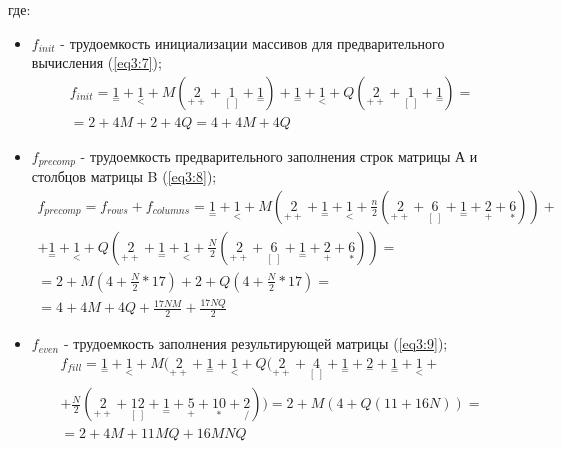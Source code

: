 где:
\begin{itemize}
	\item $f_{init}$ - трудоемкость инициализации массивов для предварительного вычисления (\ref{eq3:7});
	\begin{multline}
		\label{eq3:7}
		f_{init} = {\underset{=}{1}} + {\underset{<}{1}} + M({\underset{++}{2}} + {\underset{[\ ]}{1}} + {\underset{=}{1}}) + {\underset{=}{1}} + {\underset{<}{1}} + Q({\underset{++}{2}} + {\underset{[\ ]}{1}} + {\underset{=}{1}}) = \\
		= 2 + 4M + 2 + 4Q = 4 + 4M + 4Q 
	\end{multline}


	\item $f_{precomp}$ - трудоемкость предварительного заполнения строк матрицы А и столбцов матрицы B (\ref{eq3:8});
	\begin{multline}
		\label{eq3:8}
		f_{precomp} = f_{rows} + f_{columns} = {\underset{=}{1}} + {\underset{<}{1}} + M({\underset{++}{2}} + {\underset{=}{1}} + {\underset{<}{1}} + \frac{n}{2}({\underset{++}{2}} + {\underset{[\ ]}{6}} + {\underset{=}{1}} + {\underset{+}{2}} + {\underset{*}{6}})) + \\
		+ {\underset{=}{1}} + {\underset{<}{1}} + Q({\underset{++}{2}} + {\underset{=}{1}} + {\underset{<}{1}} + \frac{N}{2}({\underset{++}{2}} + {\underset{[\ ]}{6}} + {\underset{=}{1}} + {\underset{+}{2}} + {\underset{*}{6}})) = \\
		= 2 + M(4 + \frac{N}{2} * 17) + 2 + Q(4 + \frac{N}{2} * 17) = \\
		= 4 + 4M + 4Q + \frac{17NM}{2} + \frac{17NQ}{2}
	\end{multline}


	\item $f_{even}$ - трудоемкость заполнения результирующей матрицы (\ref{eq3:9});
	\begin{multline}
		\label{eq3:9}
		f_{fill} = {\underset{=}{1}} + {\underset{<}{1}} + M({\underset{++}{2}} + {\underset{=}{1}} + {\underset{<}{1}} + Q({\underset{++}{2}} + {\underset{[\ ]}{4}} + {\underset{=}{1}} + {\underset{-}{2}} + {\underset{=}{1}} + {\underset{<}{1}} +\\
		+ \frac{N}{2}({\underset{++}{2}} + {\underset{[\ ]}{12}} + {\underset{=}{1}} +
		{\underset{+}{5}} + {\underset{*}{10}} + {\underset{/}{2}})) = 2 + M(4 + Q(11 + 16N)) = \\
		= 2 + 4M + 11MQ + 16MNQ
	\end{multline}


\end{itemize}
